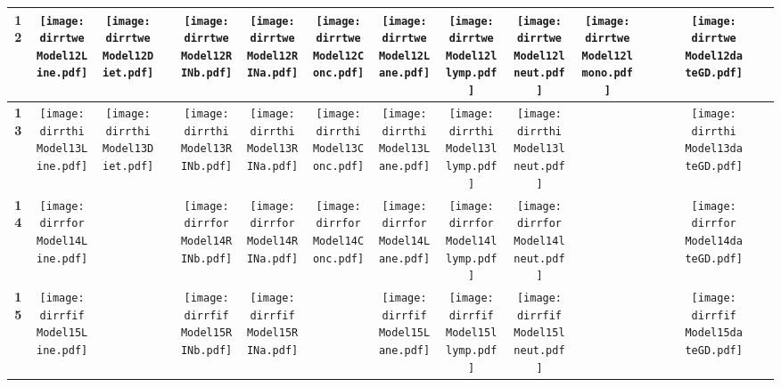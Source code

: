 \documentclass[landscape]{article}
\def \dirrtwe {/run/user/1000/gvfs/smb-share:server=cyfiles.iastate.edu,share=09/22/ntyet/R/RA/Data/Reanalysis Data/resultcbc/Model12.Line.Diet.RINb.RINa.Conc.Lane.llymp.lneut.lmono.dateGD/}
\def \dirrthi {/run/user/1000/gvfs/smb-share:server=cyfiles.iastate.edu,share=09/22/ntyet/R/RA/Data/Reanalysis Data/resultcbc/Model13.Line.Diet.RINb.RINa.Conc.Lane.llymp.lneut.dateGD/}
\def \dirrfor{/run/user/1000/gvfs/smb-share:server=cyfiles.iastate.edu,share=09/22/ntyet/R/RA/Data/Reanalysis Data/resultcbc/Model14.Line.RINb.RINa.Conc.Lane.llymp.lneut.dateGD/}
\def \dirrfif{/run/user/1000/gvfs/smb-share:server=cyfiles.iastate.edu,share=09/22/ntyet/R/RA/Data/Reanalysis Data/resultcbc/Model15.Line.RINb.RINa.Lane.llymp.lneut.dateGD/}
\begin{document}
\begin{table}
\begin{tabular}{ccccccccccccccccc}
     {\Huge \textbf{12}} 
      &\texttt{[image: \\dirrtwe Model12Line.pdf]}
      &\texttt{[image: \\dirrtwe Model12Diet.pdf]}
      &
      &\texttt{[image: \\dirrtwe Model12RINb.pdf]}
      &\texttt{[image: \\dirrtwe Model12RINa.pdf]}
      &\texttt{[image: \\dirrtwe Model12Conc.pdf]}
      &\texttt{[image: \\dirrtwe Model12Lane.pdf]}
      &\texttt{[image: \\dirrtwe Model12llymp.pdf]}
      &\texttt{[image: \\dirrtwe Model12lneut.pdf]}
      &\texttt{[image: \\dirrtwe Model12lmono.pdf]}
      &
      &
      &
      &\texttt{[image: \\dirrtwe Model12dateGD.pdf]}
     \\
     \hline
     
     {\Huge \textbf{13}} 
      &\texttt{[image: \\dirrthi Model13Line.pdf]}
      &\texttt{[image: \\dirrthi Model13Diet.pdf]}
      &
      &\texttt{[image: \\dirrthi Model13RINb.pdf]}
      &\texttt{[image: \\dirrthi Model13RINa.pdf]}
      &\texttt{[image: \\dirrthi Model13Conc.pdf]}
      &\texttt{[image: \\dirrthi Model13Lane.pdf]}
      &\texttt{[image: \\dirrthi Model13llymp.pdf]}
      &\texttt{[image: \\dirrthi Model13lneut.pdf]}
      &
      &
      &
      &
      &\texttt{[image: \\dirrthi Model13dateGD.pdf]}
     \\
     \hline
     

      {\Huge \textbf{14}} 
      &\texttt{[image: \\dirrfor Model14Line.pdf]}
      &
      &
      &\texttt{[image: \\dirrfor Model14RINb.pdf]}
      &\texttt{[image: \\dirrfor Model14RINa.pdf]}
      &\texttt{[image: \\dirrfor Model14Conc.pdf]}
      &\texttt{[image: \\dirrfor Model14Lane.pdf]}
      &\texttt{[image: \\dirrfor Model14llymp.pdf]}
      &\texttt{[image: \\dirrfor Model14lneut.pdf]}
      &
      &
      &
      &
      &\texttt{[image: \\dirrfor Model14dateGD.pdf]}
     \\
     \hline
     
     {\Huge \textbf{15}} 
      &\texttt{[image: \\dirrfif Model15Line.pdf]}
      &
      &
      &\texttt{[image: \\dirrfif Model15RINb.pdf]}
      &\texttt{[image: \\dirrfif Model15RINa.pdf]}
      &
      &\texttt{[image: \\dirrfif Model15Lane.pdf]}
      &\texttt{[image: \\dirrfif Model15llymp.pdf]}
      &\texttt{[image: \\dirrfif Model15lneut.pdf]}
      &
      &
      &
      &
      &\texttt{[image: \\dirrfif Model15dateGD.pdf]}
     \\
     \hline
     

\end{tabular}
\end{table}
\end{document}
